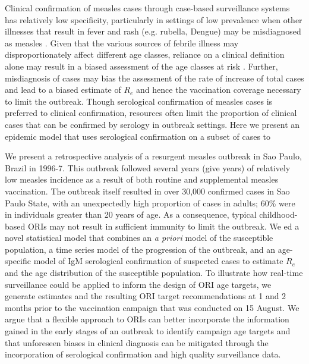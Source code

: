 Clinical confirmation of measles cases through case-based surveillance systems has relatively low specificity,
particularly in settings of low prevalence \cite{Hutchins_2004}\cite{Ho_2014}\cite{GUY_2004} when other illnesses that result in fever and
rash (e.g. rubella, Dengue) may be misdiagnosed as measles \cite{Ho_2014}. Given that the various sources of febrile illness may
disproportionately affect different age classes, reliance on a clinical
definition alone may result in a biased assessment of the age classes at
risk \cite{Hutchins_2004,Durrheim_2014}. Further, misdiagnosis of
cases may bias the assessment of the rate of increase of total cases and
lead to a biased estimate of \(R_{e}\) and hence the vaccination
coverage necessary to limit the outbreak. Though serological
confirmation of measles cases is preferred to clinical confirmation,
resources often limit the proportion of clinical cases that can be
confirmed by serology in outbreak settings. Here we present an epidemic
model that uses serological confirmation on a subset of cases to

We present a retrospective analysis of a resurgent measles outbreak in
Sao Paulo, Brazil in 1996-7. This outbreak followed several years (give years) of
relatively low measles incidence as a result of both routine and
supplemental measles vaccination. The outbreak itself resulted in over
30,000 confirmed cases in Sao Paulo State, with an unexpectedly high
proportion of cases in adults; 60\% were in individuals greater than 20
years of age. As a consequence, typical childhood-based ORIs may not result in sufficient immunity to limit the outbreak. We
ed a novel statistical model that combines an \emph{a priori} model
of the susceptible population, a time series model of the progression of
the outbreak, and an age-specific model of IgM serological confirmation
of suspected cases to estimate \(R_{e}\)and the age distribution of the
susceptible population. To illustrate how real-time surveillance could
be applied to inform the design of ORI age targets, we generate
estimates and the resulting ORI target recommendations at 1
and 2 months prior to the vaccination campaign that was
conducted on 15 August. We argue that a flexible approach to ORIs can
better incorporate the information gained in the early stages of an
outbreak to identify campaign age targets and that unforeseen biases in
clinical diagnosis can be mitigated through the incorporation of
serological confirmation and high quality surveillance data.